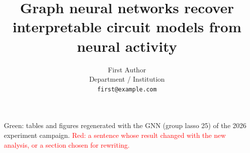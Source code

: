 \documentclass{article}
\title{Graph neural networks recover interpretable circuit models from neural activity}
\author{%
  First Author \\
  Department / Institution \\
  \texttt{first@example.com} \\
}
\begin{document}
\maketitle
\begin{center}\small\textcolor{revised}{Green: tables and figures regenerated with the GNN (group lasso 25) of the 2026 experiment campaign.} \textcolor{red}{Red: a sentence whose result changed with the new analysis, or a section chosen for rewriting.}\end{center}



\begin{abstract}




\end{abstract}
\end{document}
